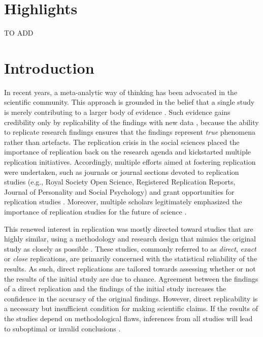 \documentclass[review, 3p, authoryear]{elsarticle} %
\begin{document}
\hypertarget{highlights}{%
\section{Highlights}\label{highlights}}

TO ADD

\hypertarget{introduction}{%
\section{Introduction}\label{introduction}}

In recent years, a meta-analytic way of thinking has been advocated in the scientific community.
This approach is grounded in the belief that a single study is merely contributing to a larger body of evidence \citep[e.g.,][]{asendorpf_recommendations_2016, cumming_new_2014, goodman_reproducibility_2016}.
Such evidence gains credibility only by replicability of the findings with new data \citep{schmidt_replication_2009}, because the ability to replicate research findings ensures that the findings represent \emph{true} phenomena rather than artefacts.
The replication crisis in the social sciences placed the importance of replication back on the research agenda and kickstarted multiple replication initiatives.
Accordingly, multiple efforts aimed at fostering replication were undertaken, such as journals or journal sections devoted to replication studies (e.g., Royal Society Open Science, Registered Replication Reports, Journal of Personality and Social Psychology) and grant opportunities for replication studies \citep[e.g.,][]{nwo_replication_2020}.
Moreover, multiple scholars legitimately emphasized the importance of replication studies for the future of science \citep[e.g.,][]{baker_reproducibility_2016, brandt_et_al_replication_2014, munafo_manifesto_2017}.

This renewed interest in replication was mostly directed toward studies that are highly similar, using a methodology and research design that mimics the original study as closely as possible \citep[e.g.,][]{camerer2016evaluating, camerer2018evaluating, klein_etal_replicability_2014, nosek_replicability_review_2021, open_science_collab_2015}.
These studies, commonly referred to as \emph{direct}, \emph{exact} or \emph{close} replications, are primarily concerned with the statistical reliability of the results.
As such, direct replications are tailored towards assessing whether or not the results of the initial study are due to chance.
Agreement between the findings of a direct replication and the findings of the initial study increases the confidence in the accuracy of the original findings.
However, direct replicability is a necessary but insufficient condition for making scientific claims.
If the results of the studies depend on methodological flaws, inferences from all studies will lead to suboptimal or invalid conclusions \citep{lawlor_triangulation_2017, munafo_robust_2018}.
\end{document}
